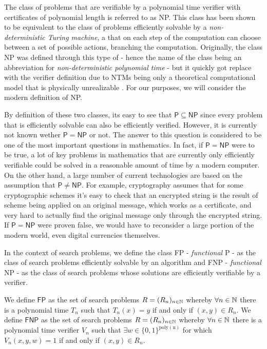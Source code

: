 The class of problems that are verifiable by a polynomial time verifier with certificates of polynomial length is referred to as \textsf{NP}. This class has been shown to be equivalent to the class of problems efficiently solvable by a \textit{non-deterministic Turing machine}, a \TM that on each step of the computation can choose between a set of possible actions, branching the computation. Originally, the class \textsf{NP} was defined through this type of \TM \@ - hence the name of the class being an abbreviation for \textit{non-deterministic polynomial time} - but it quickly got replace with the verifier definition due to \textsf{NTM}s being only a theoretical computational model that is physically unrealizable \cite{complexity_arora_barak}. For our purposes, we will consider the modern definition of \textsf{NP}.

By definition of these two classes, its easy to see that $\mathsf{P} \subseteq \mathsf{NP}$ since every problem that is efficiently solvable can also be efficiently verified. However, it is currently not known wether $\mathsf{P} = \mathsf{NP}$ or not. The answer to this question is considered to be one of the most important questions in mathematics. In fact, if $\mathsf{P} = \mathsf{NP}$ were to be true, a lot of key problems in mathematics that are currently only efficiently verifiable could be solved in a reasonable amount of time by a modern computer. On the other hand, a large number of current technologies are based on the assumption that $\mathsf{P} \neq \mathsf{NP}$. For example, cryptography assumes that for some cryptographic schemes it's easy to check that an encrypted string is the result of scheme being applied on an original message, which works as a certificate, and very hard to actually find the original message only through the encrypted string. If $\mathsf{P} = \mathsf{NP}$ were proven false, we would have to reconsider a large portion of the modern world, even digital currencies themselves.

In the context of search problems, we define the class \textsf{FP} - \textit{functional} \textsf{P} - as the class of search problems efficiently solvable by an algorithm and \textsf{FNP} - \textit{functional} \textsf{NP} - as the class of search problems whose solutions are efficiently verifiable by a verifier. 

\newpage

\begin{definition}
    We define $\mathsf{FP}$ as the set of search problems $R = (R_n)_{n \in \mathbb{N}}$ whereby $\forall n \in \mathbb{N}$ there is a polynomial time \TM $T_n$ such that $T_n(x) = y$ if and only if $(x,y) \in R_n$. We define $\mathsf{FNP}$ as the set of search problems $R = (R_n)_{n \in \mathbb{N}}$ whereby $\forall n \in \mathbb{N}$ there is a polynomial time verifier $V_n$ such that $\exists w \in \{0,1\}^{\mathrm{poly(n)}}$ for which $V_n(x,y,w) = 1$ if and only if $(x,y) \in R_n$. 
\end{definition}

